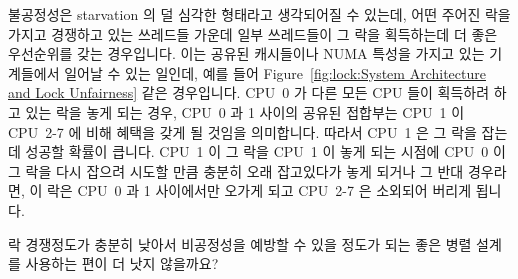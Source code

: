불공정성은 starvation 의 덜 심각한 형태라고 생각되어질 수 있는데, 어떤 주어진
락을 가지고 경쟁하고 있는 쓰레드들 가운데 일부 쓰레드들이 그 락을 획득하는데 더
좋은 우선순위를 갖는 경우입니다.
이는 공유된 캐시들이나 NUMA 특성을 가지고 있는 기계들에서 일어날 수 있는
일인데, 예를 들어
Figure~\ref{fig:lock:System Architecture and Lock Unfairness} 같은 경우입니다.
CPU~0 가 다른 모든 CPU 들이 획득하려 하고 있는 락을 놓게 되는 경우, CPU~0 과 1
사이의 공유된 접합부는 CPU~1 이 CPU~2-7 에 비해 혜택을 갖게 될 것임을
의미합니다.
따라서 CPU~1 은 그 락을 잡는데 성공할 확률이 큽니다.
CPU~1 이 그 락을 CPU~1 이 놓게 되는 시점에 CPU~0 이 그 락을 다시 잡으려 시도할
만큼 충분히 오래 잡고있다가 놓게 되거나 그 반대 경우라면, 이 락은 CPU~0 과 1
사이에서만 오가게 되고 CPU~2-7 은 소외되어 버리게 됩니다.

\QuickQuiz{}
	락 경쟁정도가 충분히 낮아서 비공정성을 예방할 수 있을 정도가 되는 좋은
	병렬 설계를 사용하는 편이 더 낫지 않을까요?
	\iffalse

